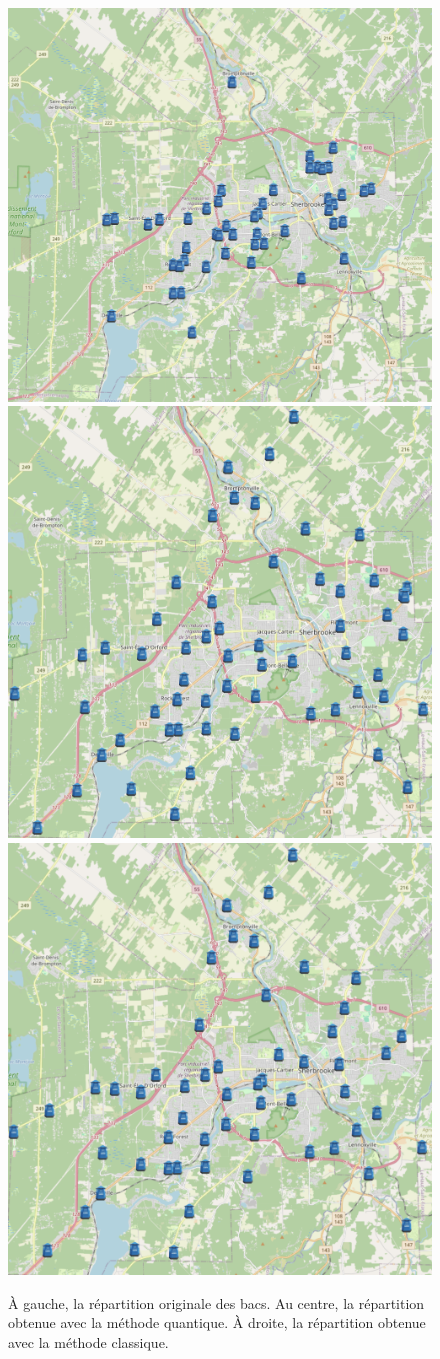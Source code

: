 \documentclass[11pt]{article}
\begin{document}
\begin{figure}[H]
    \centering
    \includegraphics[width=0.33\linewidth]{images/original.png}
    \includegraphics[width=0.30\linewidth]{images/new_quantum.png}
    \includegraphics[width=0.30\linewidth]{images/new_classical.png}
    \caption{À gauche, la répartition originale des bacs. Au centre, la répartition obtenue avec la méthode quantique. À droite, la répartition obtenue avec la méthode classique.}
    \label{new_dist}
\end{figure}
\end{document}
